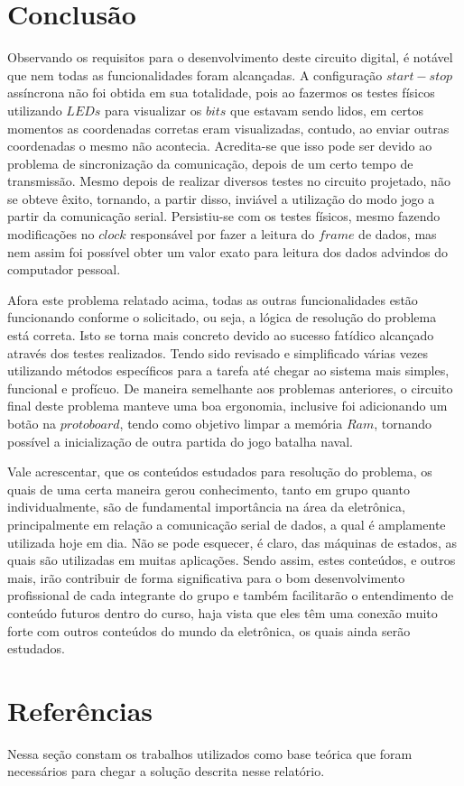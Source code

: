 \documentclass[12pt]{article}
\begin{document}
\section{Conclusão}

Observando os requisitos para o desenvolvimento deste circuito digital, é notável que nem todas as funcionalidades foram alcançadas. A configuração $start-stop$ assíncrona não foi obtida em sua totalidade, pois ao fazermos os testes físicos utilizando $LEDs$ para visualizar os $bits$ que estavam sendo lidos, em certos momentos as coordenadas corretas eram visualizadas, contudo, ao enviar outras coordenadas o mesmo não acontecia. Acredita-se que isso pode ser devido ao problema de sincronização da comunicação, depois de um certo tempo de transmissão. Mesmo depois de realizar diversos testes no circuito projetado, não se obteve êxito, tornando, a partir disso, inviável a utilização do modo jogo a partir da comunicação serial. Persistiu-se com os testes físicos, mesmo fazendo modificações no $clock$ responsável por fazer a leitura do $frame$ de dados, mas nem assim foi possível obter um valor exato para leitura dos dados advindos do computador pessoal.


Afora este problema relatado acima, todas as outras funcionalidades estão funcionando conforme o solicitado, ou seja, a lógica de resolução do problema está correta. Isto se torna mais concreto devido ao sucesso fatídico alcançado através dos testes realizados. Tendo sido revisado e simplificado várias vezes utilizando métodos específicos para a tarefa até chegar ao sistema mais simples, funcional e profícuo. De maneira semelhante aos problemas anteriores, o circuito final deste problema manteve uma boa ergonomia, inclusive foi adicionando um botão na $protoboard$, tendo como objetivo limpar a memória $Ram$, tornando possível a inicialização de outra partida do jogo batalha naval. 

Vale acrescentar, que os conteúdos estudados para resolução do problema, os quais de uma certa maneira gerou conhecimento, tanto em grupo quanto individualmente, são de fundamental importância na área da eletrônica, principalmente em relação a comunicação serial de dados, a qual é amplamente utilizada hoje em dia. Não se pode esquecer, é claro, das máquinas de estados, as quais são utilizadas em muitas aplicações. Sendo assim, estes conteúdos, e outros mais, irão contribuir de forma significativa para o bom desenvolvimento profissional de cada integrante do grupo e também facilitarão o entendimento de conteúdo futuros dentro do curso, haja vista que eles têm uma conexão muito forte com outros conteúdos do mundo da eletrônica, os quais ainda serão estudados.


\section{Referências}

Nessa seção constam os trabalhos utilizados como base teórica que foram necessários para chegar a solução descrita nesse relatório.




\end{document}
